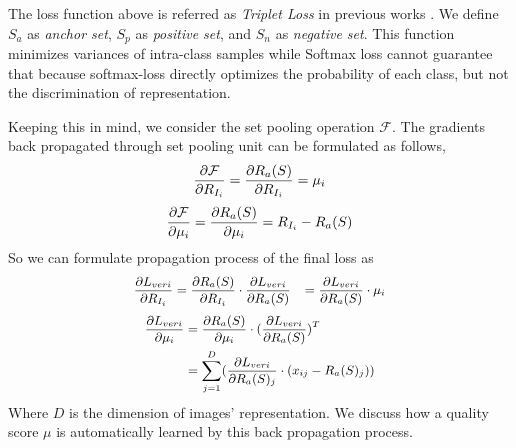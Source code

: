 The loss function above is referred as \emph{Triplet Loss} in previous works \cite{schroff2015facenet}. We define $S_a$ as \emph{anchor set}, $S_p$ as \emph{positive set}, and $S_n$ as \emph{negative set}.  This function minimizes variances of intra-class samples while Softmax loss cannot guarantee that because softmax-loss directly optimizes the probability of each class, but not the discrimination of representation.




Keeping this in mind, we consider the set pooling operation $\mathcal{F}$. The gradients back propagated through set pooling unit can be formulated as follows,
\begin{equation}
\small
\label{eq9}
\frac{\partial \mathcal{F}}{\partial R_{I_i}} =\frac{\partial R_a(S)}{\partial R_{I_i}} =\mu_i
\end{equation}
\begin{equation}
\small
\label{10}
\frac{\partial \mathcal{F}}{\partial \mu_i} =\frac{\partial R_a(S)}{\partial \mu_i} = R_{I_i} - R_a(S)
\end{equation}
So we can formulate propagation process of the final loss as
\begin{equation}
\small
\begin{aligned}
\label{11a}
\frac{\partial L_{veri}}{\partial R_{I_i}}
&= \frac{\partial R_a(S)}{\partial R_{I_i}} \cdot \frac{\partial L_{veri}}{\partial R_a(S)}  
&= \frac{\partial L_{veri}}{\partial R_a(S)} \cdot \mu_i
\end{aligned}
\end{equation}
\begin{equation}
\small
\begin{aligned}
\frac{\partial L_{veri}}{\partial \mu_i} &= \frac{\partial R_a(S)}{\partial \mu_i} \cdot (\frac{\partial L_{veri}}{\partial R_a(S)})^T  \\
&= \sum_{j=1}^D ( \frac{\partial L_{veri}}{\partial R_a(S)_j} \cdot ( x_{ij} - R_a(S)_j ) )
\label{11b}
\end{aligned}
\end{equation}
Where $D$ is the dimension of images' representation. We discuss how a quality score $\mu$ is automatically learned by this back propagation process.


